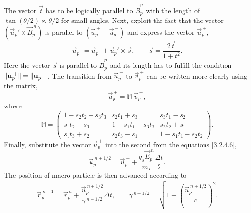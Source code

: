 The vector $ \vec{t} $ has to be logically parallel to $ \vec{B}_{p}^{n} $ with the length of $ \tan \left(\theta/2\right) \approx \theta/2 $ for small angles. Next, exploit the fact that the vector $ (\vec{u}_{p}\!' \times \vec{B}_{p}^{\:n}) $ is parallel to $ \left(\vec{u}_{p}^{\:+} - \vec{u}_{p}^{\:-} \right) $ and express the vector $ \vec{u}_{p}^{\:+} $,
\begin{equation}
\vec{u}_{p}^{\:+} = \vec{u}_{p}^{\:-} + \vec{u}_{p}\!' \times \vec{s}, \qquad \vec{s} = \frac{2\vec{t}}{1 + t^2}.
\end{equation}
Here the vector $ \vec{s} $ is parallel to $ \vec{B}_{p}^{n} $ and its length has to fulfill the condition $ \lVert\mathbf{u}_{p}^{\:+}\rVert = \lVert\mathbf{u}_{p}^{\:-}\rVert $. The transition from $ \vec{u}_{p}^{\:-} $ to $ \vec{u}_{p}^{\:+} $ can be written more clearly using the matrix,
\begin{equation}
\vec{u}_{p}^{\:+} = \mathbb{M} \: \vec{u}_{p}^{\:-},
\end{equation}
where \vspace{5mm}
\begingroup
\renewcommand*{\arraystretch}{1.8}
\begin{equation}
\mathbb{M} = 
\begin{pmatrix}
1 - s_{2}t_{2} - s_{3}t_{3} & s_{2}t_{1} + s_{3} & s_{3}t_{1} - s_{2} \\
s_{1}t_{2} - s_{3} & 1 - s_{1}t_{1} - s_{3}t_{3} & s_{3}t_{2} + s_{1} \\
s_{1}t_{3} + s_{2} & s_{2}t_{3} - s_{1} & 1 - s_{1}t_{1} - s_{2}t_{2}
\end{pmatrix}.
\end{equation}
\endgroup
Finally, substitute the vector $ \vec{u}_{p}^{\:+} $ into the second from the equations \ref{3.2.4.6},
\begin{equation}
\vec{u}_{p}^{\:n+1/2} = \vec{u}_{p}^{\:+} + \frac{q_{s} \vec{E}_{p}^{\:n}}{m_{s}} \frac{\Delta t}{2}.
\end{equation}
The position of macro-particle is then advanced according to
\begin{equation}
\vec{r}_{p}^{\:n+1} = \vec{r}_{p}^{\:n} + \frac{\vec{u}_{p}^{\:n + 1/2}}{\gamma^{\:n + 1/2}} \Delta t, \qquad \gamma^{\:n + 1/2} = \sqrt{1 + \left(\frac{\vec{u}_{p}^{\:n + 1/2}}{c}\right)^{2}}.
\end{equation}


